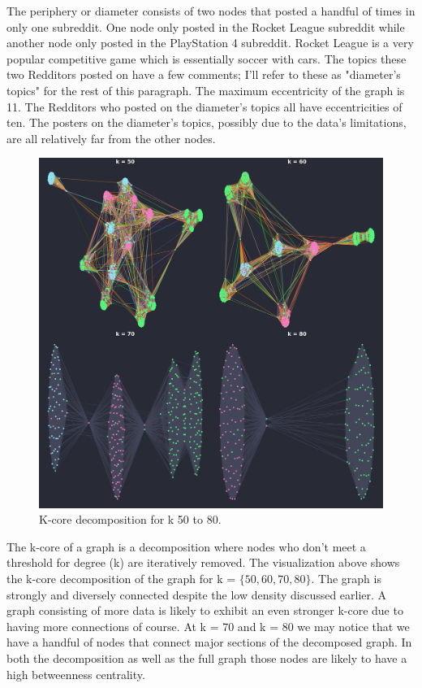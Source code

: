 \documentclass[12pt, a4paper]{article}
\begin{document}
The periphery or diameter consists of two nodes that posted a handful of times in only one subreddit. One node only posted in the Rocket League subreddit while another node only posted in the PlayStation 4 subreddit. Rocket League is a very popular competitive game which is essentially soccer with cars. The topics these two Redditors posted on have a few comments; I'll refer to these as "diameter's topics" for the rest of this paragraph. The maximum eccentricity of the graph is 11. The Redditors who posted on the diameter's topics all have eccentricities of ten. The posters on the diameter's topics, possibly due to the data's limitations, are all relatively far from the other nodes.

\begin{figure}[ht!]
  \centering
  \includegraphics[width=\textwidth]{network_k_core_50_80.png}
  \caption{K-core decomposition for k 50 to 80.}
  \label{fig:kcore50_80}
\end{figure}

The k-core of a graph is a decomposition where nodes who don't meet a threshold for degree (k) are iteratively removed. The visualization above shows the k-core decomposition of the graph for k = $\{50, 60, 70, 80\}$. The graph is strongly and diversely connected despite the low density discussed earlier. A graph consisting of more data is likely to exhibit an even stronger k-core due to having more connections of course. At k = 70 and k = 80 we may notice that we have a handful of nodes that connect major sections of the decomposed graph. In both the decomposition as well as the full graph those nodes are likely to have a high betweenness centrality.
\end{document}
